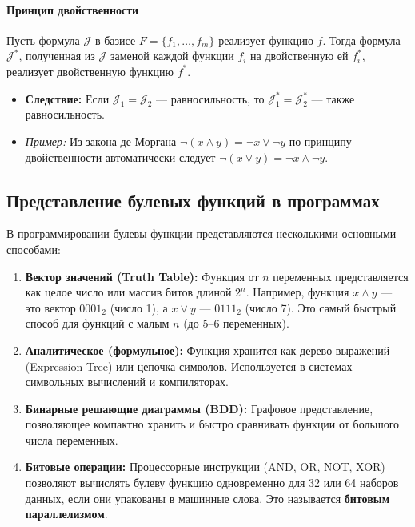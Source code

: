 \paragraph{Принцип двойственности}
Пусть формула $\mathcal{J}$ в базисе $F = \{f_1, \dots, f_m\}$ реализует функцию $f$. Тогда формула $\mathcal{J}^*$, полученная из $\mathcal{J}$ заменой каждой функции $f_i$ на двойственную ей $f_i^*$, реализует двойственную функцию $f^*$.
\begin{itemize}
    \item \textbf{Следствие:} Если $\mathcal{J}_1 = \mathcal{J}_2$ — равносильность, то $\mathcal{J}_1^* = \mathcal{J}_2^*$ — также равносильность.
    \item \textit{Пример:} Из закона де Моргана $\neg(x \land y) = \neg x \lor \neg y$ по принципу двойственности автоматически следует $\neg(x \lor y) = \neg x \land \neg y$.
\end{itemize}

\subsection*{Представление булевых функций в программах}

В программировании булевы функции представляются несколькими основными способами:

\begin{enumerate}
    \item \textbf{Вектор значений (Truth Table):}
    Функция от $n$ переменных представляется как целое число или массив битов длиной $2^n$. Например, функция $x \land y$ — это вектор $0001_2$ (число 1), а $x \lor y$ — $0111_2$ (число 7). Это самый быстрый способ для функций с малым $n$ (до 5–6 переменных).
    
    \item \textbf{Аналитическое (формульное):}
    Функция хранится как дерево выражений (Expression Tree) или цепочка символов. Используется в системах символьных вычислений и компиляторах.
    
    \item \textbf{Бинарные решающие диаграммы (BDD):}
    Графовое представление, позволяющее компактно хранить и быстро сравнивать функции от большого числа переменных.
    
    \item \textbf{Битовые операции:}
    Процессорные инструкции (AND, OR, NOT, XOR) позволяют вычислять булеву функцию одновременно для 32 или 64 наборов данных, если они упакованы в машинные слова. Это называется \textbf{битовым параллелизмом}.
\end{enumerate}
